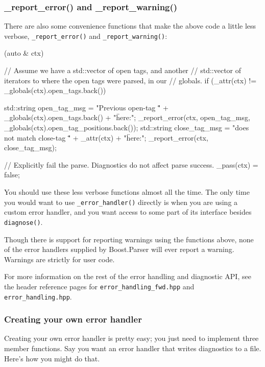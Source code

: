 \subsubsection{\_report\_error() and \_report\_warning()}

There are also some convenience functions that make the above code a little less verbose, \texttt{\_report\_error()} and \texttt{\_report\_warning()}:

\begin{code}
[](auto & ctx) {
    // Assume we have a std::vector of open tags, and another
    // std::vector of iterators to where the open tags were parsed, in our
    // globals.
    if (_attr(ctx) != _globals(ctx).open_tags.back()) {
        std::string open_tag_msg =
            "Previous open-tag \"" + _globals(ctx).open_tags.back() + "\" here:";
        _report_error(ctx, open_tag_msg, _globals(ctx).open_tag_positions.back());
        std::string close_tag_msg =
            "does not match close-tag \"" + _attr(ctx) + "\" here:";
        _report_error(ctx, close_tag_msg);

        // Explicitly fail the parse.  Diagnostics do not affect parse success.
        _pass(ctx) = false;
    }
}
\end{code}

You should use these less verbose functions almost all the time. The only time you would want to use \texttt{\_error\_handler()} directly is when you are using a custom error handler, and you want access to some part of its interface besides \texttt{diagnose()}.

Though there is support for reporting warnings using the functions above, none of the error handlers supplied by Boost.Parser will ever report a warning. Warnings are strictly for user code.

For more information on the rest of the error handling and diagnostic API, see the header reference pages for \texttt{error\_handling\_fwd.hpp} and \texttt{error\_handling.hpp}.

\subsubsection{Creating your own error handler}

Creating your own error handler is pretty easy; you just need to implement three member functions. Say you want an error handler that writes diagnostics to a file. Here's how you might do that.

